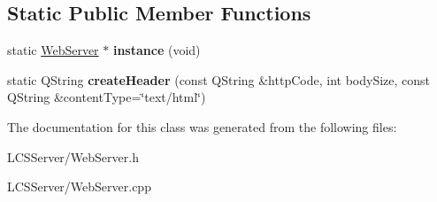 \subsection*{Static Public Member Functions}
\begin{DoxyCompactItemize}
\item 
\mbox{\label{class_web_server_a6c77ab01f931f6fed751b2496eec8077}} 
static \hyperlink{class_web_server}{Web\+Server} $\ast$ {\bfseries instance} (void)
\item 
\mbox{\label{class_web_server_a99f5239a06368b29ca8bfd6a24be1f98}} 
static Q\+String {\bfseries create\+Header} (const Q\+String \&http\+Code, int body\+Size, const Q\+String \&content\+Type=\char`\"{}text/html\char`\"{})
\end{DoxyCompactItemize}


The documentation for this class was generated from the following files\+:\begin{DoxyCompactItemize}
\item 
L\+C\+S\+Server/Web\+Server.\+h\item 
L\+C\+S\+Server/Web\+Server.\+cpp\end{DoxyCompactItemize}
